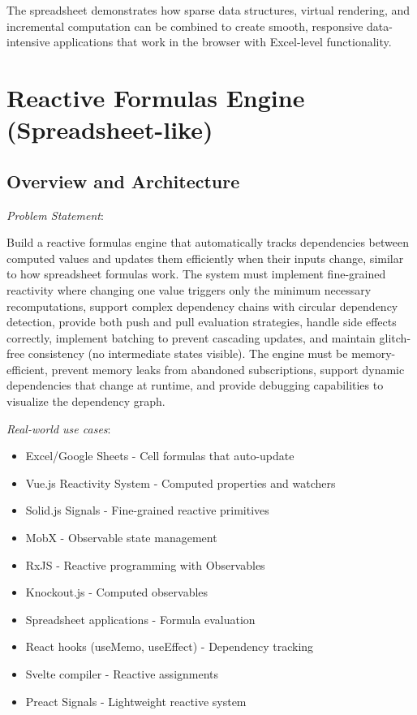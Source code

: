 \documentclass[11pt]{article}
\begin{document}
The spreadsheet demonstrates how sparse data structures, virtual rendering, and incremental computation can be combined to create smooth, responsive data-intensive applications that work in the browser with Excel-level functionality.
\section{Reactive Formulas Engine (Spreadsheet-like)}
\label{sec:org23ef724}

\subsection{Overview and Architecture}
\label{sec:org4eb9a24}

\emph{Problem Statement}:

Build a reactive formulas engine that automatically tracks dependencies between computed values and updates them efficiently when their inputs change, similar to how spreadsheet formulas work. The system must implement fine-grained reactivity where changing one value triggers only the minimum necessary recomputations, support complex dependency chains with circular dependency detection, provide both push and pull evaluation strategies, handle side effects correctly, implement batching to prevent cascading updates, and maintain glitch-free consistency (no intermediate states visible). The engine must be memory-efficient, prevent memory leaks from abandoned subscriptions, support dynamic dependencies that change at runtime, and provide debugging capabilities to visualize the dependency graph.

\emph{Real-world use cases}:

\begin{itemize}
\item Excel/Google Sheets - Cell formulas that auto-update
\item Vue.js Reactivity System - Computed properties and watchers
\item Solid.js Signals - Fine-grained reactive primitives
\item MobX - Observable state management
\item RxJS - Reactive programming with Observables
\item Knockout.js - Computed observables
\item Spreadsheet applications - Formula evaluation
\item React hooks (useMemo, useEffect) - Dependency tracking
\item Svelte compiler - Reactive assignments
\item Preact Signals - Lightweight reactive system
\end{itemize}
\end{document}
